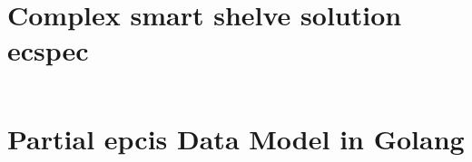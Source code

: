 \begin{appendices}
\clearpage

\section{Complex smart shelve solution \acs{ecspec}}
\label{apx:complexecspec}
\inputminted[linenos, breaklines, frame=single]{xml}{./code/ECSpec_final.xml}

\clearpage

\section{Partial \acs{epcis} Data Model in Golang}
\label{apx:epcisgolang}
\inputminted[linenos, breaklines, frame=single]{xml}{./code/parser.go}


\end{appendices}